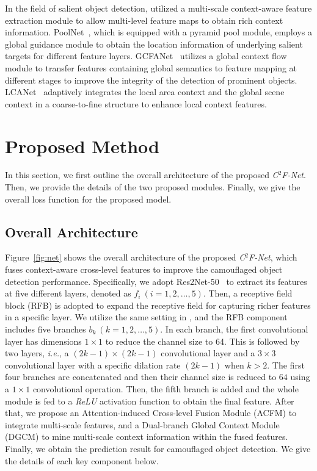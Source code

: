 \documentclass{article}
\def\ie{\emph{i.e.}}
\def\OurModel{\textit{C$^2$F-Net}} %
\begin{document}
In the field of salient object detection, \cite{bi} utilized a multi-scale context-aware feature extraction module to allow multi-level feature maps to obtain rich context information. PoolNet~\cite{poolnet}, which is equipped with a pyramid pool module, employs a global guidance module to obtain the location information of underlying salient targets for different feature layers. GCFANet~\cite{gcpanet} utilizes a global context flow module to transfer features containing global semantics to feature mapping at different stages to improve the integrity of the detection of prominent objects. LCANet~\cite{lcanet} adaptively integrates the local area context and the global scene context in a coarse-to-fine structure to enhance local context features.

\section{Proposed Method}
\label{Methods}

In this section, we first outline the overall architecture of the proposed \OurModel. Then, we provide the details of the two proposed modules. Finally, we give the overall loss function for the proposed model.



\subsection{Overall Architecture}

Figure~\ref{fig:net} shows the overall architecture of the proposed \OurModel, which fuses context-aware cross-level features to improve the camouflaged object detection performance. Specifically, we adopt Res2Net-50~\cite{res2net} to extract its  features at five different layers, denoted as $f_i~(i=1,2,\dots,5)$.
Then, a receptive field block (RFB) is adopted to expand the receptive field for capturing richer features in a specific layer. We utilize the same setting in \cite{res2net}, and the RFB component includes five branches $b_k~(k=1,2,\dots,5)$. In each branch, the first convolutional layer has dimensions $1\times{1}$ to reduce the channel size to 64. This is followed by two layers, \ie, a $(2k-1)\times(2k-1)$ convolutional layer and a $3\times{3}$ convolutional layer with a specific dilation rate $(2k-1)$ when $k>2$. The first four branches are concatenated and then their channel size is reduced to $64$ using a $1\times{1}$ convolutional operation. Then, the fifth branch is added and the whole module is fed to a \emph{ReLU} activation function to obtain the final feature. After that, we propose an Attention-induced Cross-level Fusion Module (ACFM) to integrate multi-scale features, and a Dual-branch Global Context Module (DGCM) to mine multi-scale context information within the fused features. Finally, we obtain the prediction result for camouflaged object detection. We give the details of each key component below.
\end{document}
